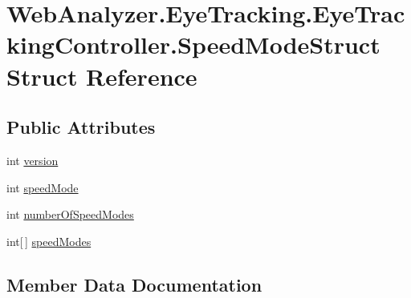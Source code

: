 \hypertarget{struct_web_analyzer_1_1_eye_tracking_1_1_eye_tracking_controller_1_1_speed_mode_struct}{}\section{Web\+Analyzer.\+Eye\+Tracking.\+Eye\+Tracking\+Controller.\+Speed\+Mode\+Struct Struct Reference}
\label{struct_web_analyzer_1_1_eye_tracking_1_1_eye_tracking_controller_1_1_speed_mode_struct}
\subsection*{Public Attributes}
\begin{DoxyCompactItemize}
\item 
int \hyperlink{struct_web_analyzer_1_1_eye_tracking_1_1_eye_tracking_controller_1_1_speed_mode_struct_a736577a64d2a391051394b4842043ffa}{version}
\item 
int \hyperlink{struct_web_analyzer_1_1_eye_tracking_1_1_eye_tracking_controller_1_1_speed_mode_struct_a8c7e2b57cbda61a046fb6e78171bad61}{speed\+Mode}
\item 
int \hyperlink{struct_web_analyzer_1_1_eye_tracking_1_1_eye_tracking_controller_1_1_speed_mode_struct_a0b61cbbcf18b04687c907f9a441868aa}{number\+Of\+Speed\+Modes}
\item 
int\mbox{[}$\,$\mbox{]} \hyperlink{struct_web_analyzer_1_1_eye_tracking_1_1_eye_tracking_controller_1_1_speed_mode_struct_a7f69461c0e78d3ba535d581f022008f2}{speed\+Modes}
\end{DoxyCompactItemize}


\subsection{Member Data Documentation}
\hypertarget{struct_web_analyzer_1_1_eye_tracking_1_1_eye_tracking_controller_1_1_speed_mode_struct_a0b61cbbcf18b04687c907f9a441868aa}{}
